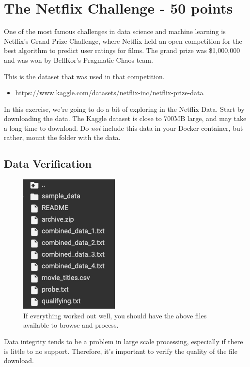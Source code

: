 \documentclass[paper=a4, fontsize=11pt]{scrartcl} %
\numberwithin{equation}{section} %
\numberwithin{figure}{section} %
\numberwithin{table}{section} %
\begin{document}
\section{The Netflix Challenge - 50 points}

One of the most famous challenges in data science and machine learning is Netflix's Grand Prize Challenge, where Netflix held an open competition for the best algorithm to predict user ratings for films. The grand prize was \$1,000,000 and was won by BellKor's Pragmatic Chaos team. 

This is the dataset that was used in that competition.
\begin{itemize}
    \item \url{https://www.kaggle.com/datasets/netflix-inc/netflix-prize-data}
\end{itemize}

In this exercise, we're going to do a bit of exploring in the Netflix Data. Start by downloading the data. The Kaggle dataset is close to 700MB large, and may take a long time to download. Do \emph{not} include this data in your Docker container, but rather, mount the folder with the data.

\subsection{Data Verification}

\begin{figure}
    \centering
    \includegraphics{images/hw1q2.png}
    \caption{If everything worked out well, you should have the above files available to browse and process.}
    \label{fig:data-files}
\end{figure}

Data integrity tends to be a problem in large scale processing, especially if there is little to no support. Therefore, it's important to verify the quality of the file download. 
\end{document}

